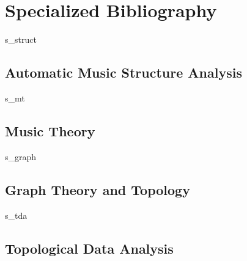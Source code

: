 \documentclass[11pt]{article}
\begin{document}
\section{Specialized Bibliography}

\begin{btSect}{s_struct}
\subsection{Automatic Music Structure Analysis}
\btPrintAll
\end{btSect}

\begin{btSect}{s_mt}
\subsection{Music Theory}
\btPrintAll
\end{btSect}

\begin{btSect}{s_graph}
\subsection{Graph Theory and Topology}
\btPrintAll
\end{btSect}

\begin{btSect}{s_tda}
\subsection{Topological Data Analysis}
\btPrintAll
\end{btSect}
\end{document}
